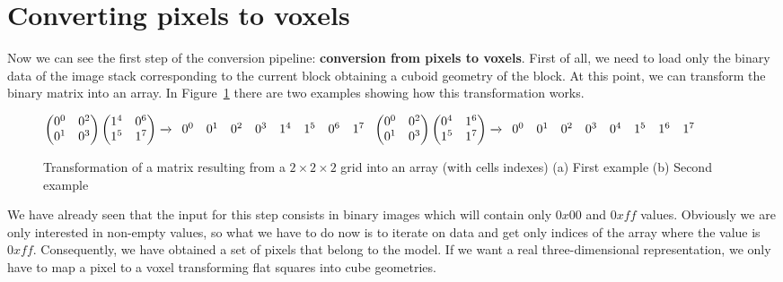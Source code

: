 \section{Converting pixels to voxels}\label{sec33:PixelsToVoxels}

Now we can see the first step of the conversion pipeline: \textbf{conversion from pixels to voxels}. First of all, we need to load only the binary data of the image stack corresponding to the current block obtaining a cuboid geometry of the block. At this point, we can transform the binary matrix into an array. In Figure~\ref{fig:linearizedMatrix} there are two examples showing how this transformation works.

\begin{figure}[htb] %
   \centering
    \begin{math}
    \begin{pmatrix}
    0^{0} & 0^{2}\\
    0^{1} & 0^{3}
    \end{pmatrix}   
    \begin{pmatrix}
    1^{4} & 0^{6}\\
    1^{5} & 1^{7}
    \end{pmatrix}
    \xrightarrow{}
    \begin{array}{c c c c c c c c}
      0^{0} & 0^{1} & 0^{2} & 0^{3} & 1^{4} & 1^{5} & 0^{6} & 1^{7}
    \end{array}
    $ $    
    \begin{pmatrix}
    0^{0} & 0^{2}\\
    0^{1} & 0^{3}
    \end{pmatrix}
   \begin{pmatrix}
    0^{4} & 1^{6}\\
    1^{5} & 1^{7}
    \end{pmatrix}
    \xrightarrow{}
    \begin{array}{c c c c c c c c}
      0^{0} & 0^{1} & 0^{2} & 0^{3} & 0^{4}  & 1^{5} & 1^{6} & 1^{7}
    \end{array}
    \end{math}
   \hfill
   \caption[Transformation of a matrix resulting from a $2\times 2\times 2$ grid into an array]{Transformation of a matrix resulting from a $2\times 2\times 2$ grid into an array (with cells indexes) (a) First example (b) Second example}
   \label{fig:linearizedMatrix}
\end{figure}

We have already seen that the input for this step consists in binary images which will contain only $0x00$ and $0xff$ values. Obviously we are only interested in non-empty values, so what we have to do now is to iterate on data and get only indices of the array where the value is $0xff$. Consequently, we have obtained a set of pixels that belong to the model. If we want a real three-dimensional representation, we only have to map a pixel to a voxel transforming flat squares into cube geometries.\\

